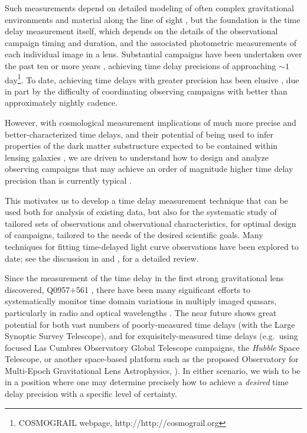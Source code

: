 \documentclass{emulateapj}
\begin{document}
Such measurements depend on detailed modeling of often complex
gravitational environments and material along the line of sight
\citep[e.g.][]{Greene2013a, Schneider2013a}, but the foundation is the
time delay measurement itself, which depends on the details of the
observational campaign timing and duration, and the associated
photometric measurements of each individual image in a
lens. Substantial campaigns have been undertaken over the past ten or
more years \citep[e.g.][]{Eigenbrod2005a, Tewes2013a}, achieving time
delay precisions of approaching $\sim1$\,day\footnote{COSMOGRAIL
  webpage, http://http://cosmograil.org}.  To date, achieving time
delays with greater precision has been elusive
\citep[e.g.][]{Oguri2007a}, due in part by the difficulty of
coordinating observing campaigns with better than approximately
nightly cadence.

However, with cosmological measurement implications of much more
precise and better-characterized time delays, and their potential of
being used to infer properties of the dark matter substructure
expected to be contained within lensing galaxies
\citep[e.g.][]{Primack2009a, Xu2009a}, we are driven to understand how
to design and analyze observing campaigns that may achieve an order of
magnitude higher time delay precision than is currently typical
\citep{Keeton2009a, Linder2011a}.

This motivates us to develop a time delay measurement technique that
can be used both for analysis of existing data, but also for the
systematic study of tailored sets of observations and observational
characteristics, for optimal design of campaigns, tailored to the
needs of the desired scientific goals. Many techniques for fitting
time-delayed light curve observations have been explored to date; see
the discussion in \citet{Dobler2015a} and \citet{Liao2015a}, for a
detailed review.

Since the measurement of the time delay in the first strong
gravitational lens discovered, Q0957$+$561 \citep{Walsh1979a,
  Press1992a}, there have been many significant efforts to
systematically monitor time domain variations in multiply imaged
quasars, particularly in radio \citep[e.g.][]{Fassnacht1999a} and
optical wavelengths \citep[c.f.\ compilations in][]{Oguri2007a,
  Mosquera2011a}.  The near future shows great potential for both vast
numbers of poorly-measured time delays (with the Large Synoptic Survey
Telescope), and for exquisitely-measured time delays (e.g.\ using
focused Las Cumbres Observatory Global Telescope campaigns, the
\emph{Hubble} Space Telescope, or another space-based platform such as
the proposed Observatory for Multi-Epoch Gravitational Lens
Astrophysics, \citealt{Moustakas2008a}). In either scenario, we wish
to be in a position where one may determine precisely how to achieve a
\emph{desired} time delay precision with a specific level of
certainty.
\end{document}
